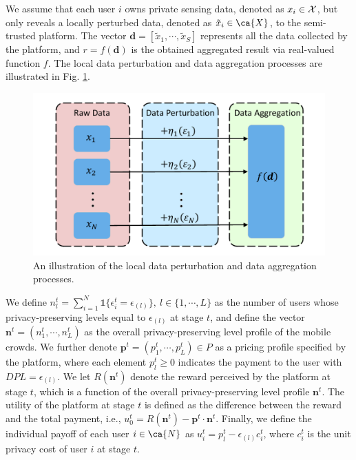 We assume that each user $i$ owns private sensing data, denoted as $x_i\in\cal{X}$, but only reveals a locally perturbed data, denoted as $\tilde{x}_i\in\ca{X}$, to the semi-trusted platform. The vector $\mathbf{d}=[\tilde{x}_1,\cdots,\tilde{x}_S]$ represents all the data collected by the platform, and $r=f(\mathbf{d})$ is the obtained aggregated result via real-valued function $f$. The local data perturbation and data aggregation processes are illustrated in Fig. \ref{pert}.
\begin{figure}[t]
\centering
\includegraphics[scale=0.5]{./pic/pert.pdf}
\caption{An illustration of the local data perturbation and data aggregation processes.}\label{pert}
\end{figure}

We define $n_l^t=\sum_{i=1}^N\mathds{1}\{\epsilon^t_i=\epsilon_{(l)}\},~l\in\{1,\cdots,L\}$ as the number of users whose privacy-preserving levels equal to $\epsilon_{(l)}$ at stage $t$, and define the vector $\mathbf{n}^t=(n^t_1,\cdots,n^t_L)$ as the overall privacy-preserving level profile of the mobile crowds. We further denote $\mathbf{p}^t=(p^t_1,\cdots,p^t_L)\in P$ as a pricing profile specified by the platform, where each element $p^t_l\geq0$ indicates the payment to the user with $DPL=\epsilon_{(l)}$. We let $R(\mathbf{n}^t)$ denote the reward perceived by the platform at stage $t$, which is a function of the overall privacy-preserving level profile $\mathbf{n}^t$. The utility of the platform at stage $t$ is defined as the difference between the reward and the total payment, i.e., $u^t_0=R(\mathbf{n}^t)-\mathbf{p}^t\cdot\mathbf{n}^t$. Finally, we define the individual payoff of each user $i\in\ca{N}$ as $u^t_i=p_l^t-\epsilon_{(l)}c^t_i$, where $c^t_i$ is the unit privacy cost of user $i$ at stage $t$. 

